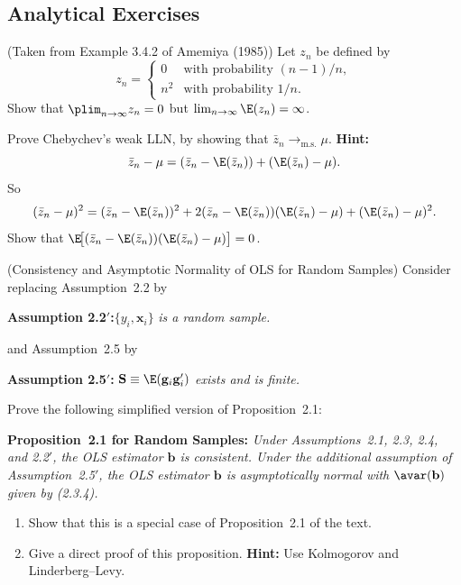 
\begin{problemset}

\subsection*{Analytical Exercises}

\exercise[1] (Taken from Example 3.4.2 of Amemiya (1985))\quad
Let $z_n$ be defined by
\[
z_n = \begin{cases}
0 & \text{with probability } (n-1)/n, \\
n^2 & \text{with probability } 1/n.
\end{cases}
\]
Show that $\plim_{n\to\infty} z_n = 0$ but $\lim_{n\to\infty} \E(z_n) = \infty$.

\exercise[2] Prove Chebychev's weak LLN, by showing that
$\bar{z}_n \to_{\text{m.s.}} \mu$. \textbf{Hint:}
\[
\bar{z}_n - \mu = (\bar{z}_n - \E(\bar{z}_n)) + (\E(\bar{z}_n) - \mu).
\]
So
\[
(\bar{z}_n - \mu)^2 = (\bar{z}_n - \E(\bar{z}_n))^2
+ 2(\bar{z}_n - \E(\bar{z}_n))(\E(\bar{z}_n) - \mu)
+ (\E(\bar{z}_n) - \mu)^2.
\]
Show that $\E\!\big[(\bar{z}_n - \E(\bar{z}_n))(\E(\bar{z}_n) - \mu)\big] = 0$.

\exercise[3] (Consistency and Asymptotic Normality of OLS for Random Samples)\quad
Consider replacing Assumption~2.2 by

\medskip
\noindent\textbf{Assumption 2.2$'$:}\quad $\{y_i, \mathbf{x}_i\}$ \emph{is a random sample.}

\medskip
\noindent and Assumption~2.5 by

\medskip
\noindent\textbf{Assumption 2.5$'$:}\quad
$\mathbf{S} \equiv \E(\mathbf{g}_i\mathbf{g}_i')$ \emph{exists and is finite.}

\medskip
\noindent
Prove the following simplified version of Proposition~2.1:

\medskip
\noindent\textbf{Proposition~2.1 for Random Samples:}\quad
\emph{Under Assumptions~2.1, 2.3, 2.4, and 2.2$'$, the OLS estimator $\mathbf{b}$ is consistent.
Under the additional assumption of Assumption~2.5$'$, the OLS estimator $\mathbf{b}$ is
asymptotically normal with $\avar(\mathbf{b})$ given by (2.3.4).}

\begin{enumerate}[label=(\alph*)]
\item Show that this is a special case of Proposition~2.1 of the text.
\item Give a direct proof of this proposition.
\textbf{Hint:} Use Kolmogorov and Linderberg--Levy.
\end{enumerate}


\end{problemset}
